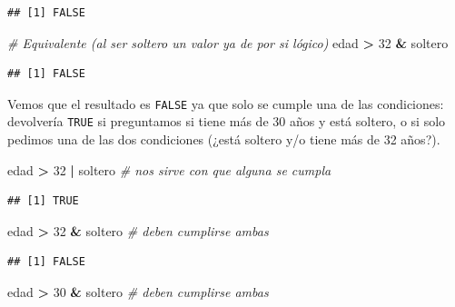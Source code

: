 \documentclass[11pt,]{book}
\newenvironment{Shaded}{\begin{snugshade}}{\end{snugshade}}
\newcommand{\CommentTok}[1]{\textcolor[rgb]{0.37,0.37,0.37}{\textit{#1}}}
\newcommand{\DecValTok}[1]{\textcolor[rgb]{0.06,0.06,0.06}{#1}}
\newcommand{\NormalTok}[1]{#1}
\newcommand{\OperatorTok}[1]{\textcolor[rgb]{0.43,0.43,0.43}{\textbf{#1}}}
\newcommand{\StringTok}[1]{\textcolor[rgb]{0.5,0.5,0.5}{#1}}
\begin{document}
\begin{verbatim}
## [1] FALSE
\end{verbatim}

\begin{Shaded}
\begin{Highlighting}[]
\CommentTok{# Equivalente (al ser soltero un valor ya de por si lógico)}
\NormalTok{edad }\OperatorTok{>}\StringTok{ }\DecValTok{32} \OperatorTok{&}\StringTok{ }\NormalTok{soltero}
\end{Highlighting}
\end{Shaded}

\begin{verbatim}
## [1] FALSE
\end{verbatim}

Vemos que el resultado es \texttt{FALSE} ya que solo se cumple una de las condiciones: devolvería \texttt{TRUE} si preguntamos si tiene más de 30 años y está soltero, o si solo pedimos una de las dos condiciones (¿está soltero y/o tiene más de 32 años?).

\begin{Shaded}
\begin{Highlighting}[]
\NormalTok{edad }\OperatorTok{>}\StringTok{ }\DecValTok{32} \OperatorTok{|}\StringTok{ }\NormalTok{soltero }\CommentTok{# nos sirve con que alguna se cumpla}
\end{Highlighting}
\end{Shaded}

\begin{verbatim}
## [1] TRUE
\end{verbatim}

\begin{Shaded}
\begin{Highlighting}[]
\NormalTok{edad }\OperatorTok{>}\StringTok{ }\DecValTok{32} \OperatorTok{&}\StringTok{ }\NormalTok{soltero }\CommentTok{# deben cumplirse ambas}
\end{Highlighting}
\end{Shaded}

\begin{verbatim}
## [1] FALSE
\end{verbatim}

\begin{Shaded}
\begin{Highlighting}[]
\NormalTok{edad }\OperatorTok{>}\StringTok{ }\DecValTok{30} \OperatorTok{&}\StringTok{ }\NormalTok{soltero }\CommentTok{# deben cumplirse ambas}
\end{Highlighting}
\end{Shaded}
\end{document}
